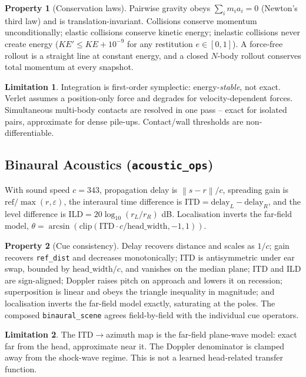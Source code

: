 \documentclass[11pt]{article}
\theoremstyle{definition}
\newtheorem{property}{Property}[section]
\newtheorem{limitation}{Limitation}[section]
\newcommand{\norm}[1]{\left\lVert #1 \right\rVert}
\newcommand{\code}[1]{\texttt{#1}}
\newcommand{\eps}{\varepsilon}
\begin{document}
\begin{property}[Conservation laws]
Pairwise gravity obeys $\sum_i m_i a_i=0$ (Newton's third law) and is
translation-invariant. Collisions conserve momentum unconditionally; elastic
collisions conserve kinetic energy; inelastic collisions never create energy
($KE'\le KE+10^{-9}$ for any restitution $e\in[0,1]$). A force-free rollout
is a straight line at constant energy, and a closed $N$-body rollout
conserves total momentum at every snapshot.
\end{property}

\begin{limitation}
Integration is first-order symplectic: energy-\emph{stable}, not exact.
Verlet assumes a position-only force and degrades for velocity-dependent
forces. Simultaneous multi-body contacts are resolved in one pass --
exact for isolated pairs, approximate for dense pile-ups. Contact/wall
thresholds are non-differentiable.
\end{limitation}

\subsection{Binaural Acoustics (\code{acoustic\_ops})}
With sound speed $c=343$, propagation delay is $\norm{s-r}/c$, spreading
gain is $\text{ref}/\max(r,\eps)$, the interaural time difference is
$\text{ITD}=\text{delay}_L-\text{delay}_R$, and the level difference is
$\text{ILD}=20\log_{10}(r_L/r_R)$ dB. Localisation inverts the far-field
model, $\theta=\arcsin(\mathrm{clip}(\text{ITD}\cdot c/\text{head\_width},-1,1))$.

\begin{property}[Cue consistency]
Delay recovers distance and scales as $1/c$; gain recovers \code{ref\_dist}
and decreases monotonically; ITD is antisymmetric under ear swap, bounded by
$\text{head\_width}/c$, and vanishes on the median plane; ITD and ILD are
sign-aligned; Doppler raises pitch on approach and lowers it on recession;
superposition is linear and obeys the triangle inequality in magnitude; and
localisation inverts the far-field model exactly, saturating at the poles.
The composed \code{binaural\_scene} agrees field-by-field with the
individual cue operators.
\end{property}

\begin{limitation}
The ITD$\to$azimuth map is the far-field plane-wave model: exact far from the
head, approximate near it. The Doppler denominator is clamped away from the
shock-wave regime. This is not a learned head-related transfer function.
\end{limitation}
\end{document}
